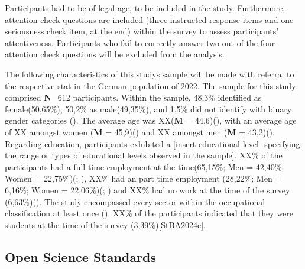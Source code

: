 \documentclass[
  12pt,
  a4paper,
  twoside]{article}
\begin{document}
Participants had to be of legal age, to be included in the study. Furthermore, attention check questions are included (three instructed response items and one seriousness check item, at the end) within the survey to assess participants' attentiveness. Participants who fail to correctly answer two out of the four attention check questions will be excluded from the analysis.

The following characteristics of this studys sample will be made with referral to the respective stat in the German population of 2022.
The sample for this study comprised \textbf{N}=612 participants. Within the sample, 48,3\% identified as female(50,65\%), 50,2\% as male(49,35\%), and 1,5\% did not identify with binary gender categories (). The average age was XX(\textbf{M} = 44,6)(), with an average age of XX amongst women (\textbf{M} = 45,9)() and XX amongst men (\textbf{M} = 43,2)(). Regarding education, participants exhibited a {[}insert educational level- specifying the range or types of educational levels observed in the sample{]}. XX\% of the participants had a full time employment at the time(65,15\%; Men = 42,40\%, Women = 22,75\%)(; ), XX\% had an part time employment (28,22\%; Men = 6,16\%; Women = 22,06\%)(; ) and XX\% had no work at the time of the survey (6,63\%)(). The study encompassed every sector within the occupational classification at least once (). XX\% of the participants indicated that they were students at the time of the survey (3,39\%){[}StBA2024c{]}.

\subsection{Open Science Standards}\label{open-science-standards}
\end{document}
